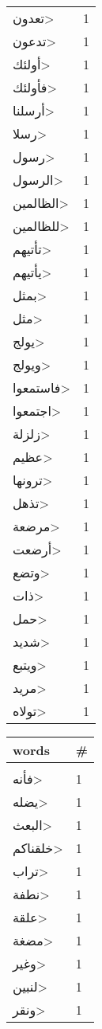 \documentclass{article}
\begin{document}
\begin{multicols}{6}
\begin{center}
\begin{tabular}{ P{2cm}  P{1cm}}
\<تعدون> & 1 \\ 
\<تدعون> & 1 \\ 
\<أولئك> & 1 \\ 
\<فأولئك> & 1 \\ 
\<أرسلنا> & 1 \\ 
\<رسلا> & 1 \\ 
\<رسول> & 1 \\ 
\<الرسول> & 1 \\ 
\<الظالمين> & 1 \\ 
\<للظالمين> & 1 \\ 
\<تأتيهم> & 1 \\ 
\<يأتيهم> & 1 \\ 
\<بمثل> & 1 \\ 
\<مثل> & 1 \\ 
\<يولج> & 1 \\ 
\<ويولج> & 1 \\ 
\<فاستمعوا> & 1 \\ 
\<اجتمعوا> & 1 \\ 
\<زلزلة> & 1 \\ 
\<عظيم> & 1 \\ 
\<ترونها> & 1 \\ 
\<تذهل> & 1 \\ 
\<مرضعة> & 1 \\ 
\<أرضعت> & 1 \\ 
\<وتضع> & 1 \\ 
\<ذات> & 1 \\ 
\<حمل> & 1 \\ 
\<شديد> & 1 \\ 
\<ويتبع> & 1 \\ 
\<مريد> & 1 \\ 
\<تولاه> & 1 \\ 
\end{tabular} 
\begin{tabular}{ P{2cm}  P{1cm}} 
\textbf{words}    & \textbf{\#}  \\
\hline
\\[0.01cm]
\<فأنه> & 1 \\ 
\<يضله> & 1 \\ 
\<البعث> & 1 \\ 
\<خلقناكم> & 1 \\ 
\<تراب> & 1 \\ 
\<نطفة> & 1 \\ 
\<علقة> & 1 \\ 
\<مضغة> & 1 \\ 
\<وغير> & 1 \\ 
\<لنبين> & 1 \\ 
\<ونقر> & 1 \\ 

\end{tabular}
\end{center}
\end{multicols}
\end{document}
